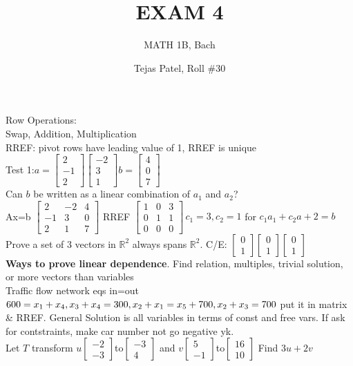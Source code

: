 \documentclass{article}
\title{EXAM 4}
\author{MATH 1B, Bach}
\date{Tejas Patel, Roll \#30}
\begin{document}
\begin{multicols*}{2}
\footnotesize Row Operations: \\ Swap, Addition, Multiplication
\\RREF: pivot rows have leading value of 1, RREF is unique
\\Test 1:$a=\begin{bmatrix}2\\-1\\2\end{bmatrix} \begin{bmatrix}-2\\3\\1\end{bmatrix} b= \begin{bmatrix}4\\0\\7\end{bmatrix}$
\\Can $b$ be written as a linear combination of $a_1$ and $a_2$? \\ Ax=b $\begin{bmatrix}2&-2&4\\-1&3&0\\2&1&7\end{bmatrix}$ 
RREF $\begin{bmatrix}1&0&3\\0&1&1\\0&0&0\end{bmatrix}\, c_1=3,c_2=1 $ for $c_1a_1+c_2a+2=b$\\Prove a set of 3 vectors in $\mathbb{R}^2$ always spans $\mathbb{R}^2$. C/E: $\begin{bmatrix}0\\1\end{bmatrix}\begin{bmatrix}0\\1\end{bmatrix}\begin{bmatrix}0\\1\end{bmatrix}$
\\\textbf{Ways to prove linear dependence}. Find relation, multiples, trivial solution, or more vectors than variables
\\Traffic flow network eqs in=out
$600=x_1+x_4,x_3+x_4=300,\\x_2+x_1=x_5+700, x_2+x_3=700$ put it in matrix \& RREF. General Solution is all variables in terms of const and free vars. If ask for contstraints, make car number not go negative yk.
\\Let $T$ transform $u \begin{bmatrix}-2\\-3\end{bmatrix}$to$ \begin{bmatrix}-3\\4\end{bmatrix}$ and $v \begin{bmatrix}5\\-1\end{bmatrix}$to$ \begin{bmatrix}16\\10\end{bmatrix}$ Find $3u+2v$

\end{multicols*}
\end{document}
